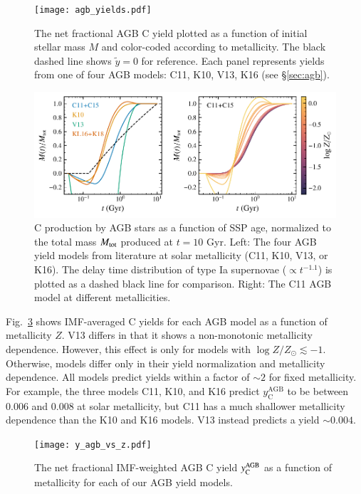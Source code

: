 \documentclass[12pt,oneside]{report}
\newcommand{\Ycagb}{\ensuremath{y_{\rm C}^{\rm AGB}}}
\newcommand{\about}[1]{${\sim} #1$}
\begin{document}
\begin{figure}
    \centering
 	    \texttt{[image: agb\_yields.pdf]}
        \caption[AGB C yields]{The net fractional AGB C yield  plotted as a function of initial stellar mass $M$ and color-coded according to metallicity. The black dashed line shows $\tilde{y}=0$ for reference. Each panel represents yields from one of four AGB models: C11, K10, V13, K16 (see \S \ref{sec:agb}). }
        \label{fig:y_agb}
\end{figure}
\begin{figure}
    \includegraphics[scale=1]{y_agb_t2.pdf}

    \caption[AGB yields delay time distribution]{
        C production by AGB stars as a function of SSP age, normalized to the total mass $M_{\rm tot}$ produced at $t=10$ Gyr. Left: The four AGB yield models from literature at solar metallicity (C11, K10, V13, or K16). The delay time distribution of type Ia supernovae ($\propto t^{-1.1}$) is plotted as a dashed black line for comparison. Right: The C11 AGB model at different metallicities. }
    \label{fig:agb-ssp}
\end{figure}


Fig.~\ref{fig:yagb-z} shows IMF-averaged C yields for each AGB model as a function of metallicity $Z$.
V13 differs in that it shows a non-monotonic metallicity dependence. However, this effect is only for models with $\log Z/Z_\odot \lesssim -1$.
Otherwise, models differ only in their yield normalization and metallicity dependence. All models predict yields within a factor of \about{2} for fixed metallicity.
For example, the three models C11, K10, and K16 predict $y_\text{C}^\text{AGB}$ to be between 0.006 and 0.008 at solar metallicity, but C11 has a much shallower metallicity dependence than the K10 and K16 models. V13 instead predicts a yield \about{0.004}.

\begin{figure}
    \centering
    \texttt{[image: y\_agb\_vs\_z.pdf]}

    \caption[AGB yield metallicity dependence]{The net fractional IMF-weighted AGB C yield $\Ycagb$ as a function of metallicity for each of our AGB yield models.
    }
    \label{fig:yagb-z}
\end{figure}
\end{document}
